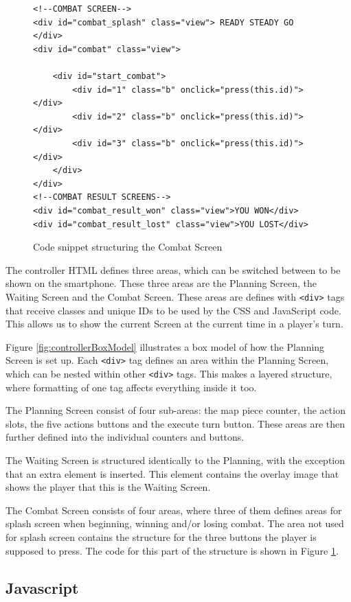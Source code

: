 \begin{figure}
\begin{lstlisting}
<!--COMBAT SCREEN-->
<div id="combat_splash" class="view"> READY STEADY GO </div>
<div id="combat" class="view">

	<div id="start_combat">
		<div id="1" class="b" onclick="press(this.id)"></div>
		<div id="2" class="b" onclick="press(this.id)"></div>
		<div id="3" class="b" onclick="press(this.id)"></div>
	</div>
</div>
<!--COMBAT RESULT SCREENS-->
<div id="combat_result_won" class="view">YOU WON</div>
<div id="combat_result_lost" class="view">YOU LOST</div>
\end{lstlisting}
\caption{Code snippet structuring the Combat Screen \label{HTMLex}}
\end{figure}

The controller HTML defines three areas, which can be switched between to be shown on the smartphone. These three areas are the Planning Screen, the Waiting Screen and the Combat Screen. These areas are defines with \texttt{<div>} tags that receive classes and unique IDs to be used by the CSS and JavaScript code. This allows us to show the current Screen at the current time in a player's turn.

Figure \ref{fig:controllerBoxModel} illustrates a box model of how the Planning Screen is set up. Each \texttt{<div>} tag defines an area within the Planning Screen, which can be nested within other \texttt{<div>} tags. This makes a layered structure, where formatting of one tag affects everything inside it too.

The Planning Screen consist of four sub-areas: the map piece counter, the action slots, the five actions buttons and the execute turn button. These areas are then further defined into the individual counters and buttons.

The Waiting Screen is structured identically to the Planning, with the exception that an extra element is inserted. This element contains the overlay image that shows the player that this is the Waiting Screen.

The Combat Screen consists of four areas, where three of them defines areas for splash screen when beginning, winning and/or losing combat. The area not used for splash screen contains the structure for the three buttons the player is supposed to press. The code for this part of the structure is shown in Figure \ref{HTMLex}.

\subsection{Javascript}\label{controllerJavascript}


